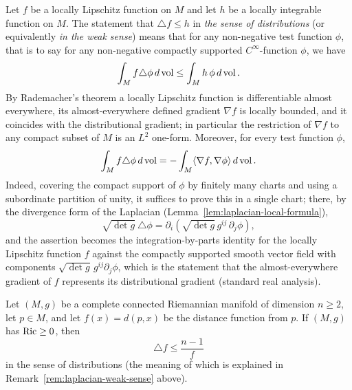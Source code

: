 \begin{remark}
\label{rem:laplacian-weak-sense}

\label{calabi}

Let $f$ be a locally Lipschitz function on $M$ and let $h$ be a
locally integrable function on $M$. The statement that $\triangle
f\leq h$ in {\sl the sense of distributions} (or equivalently {\sl
in the weak sense}) means that for any non-negative test function
$\phi$, that is to say for any non-negative compactly supported
$C^\infty$-function $\phi$, we have
$$\int_Mf\triangle \phi\, d\operatorname{vol}\le \int_M h\,\phi\, d\operatorname{vol}.$$
By Rademacher's theorem a locally Lipschitz function is
differentiable almost everywhere, its almost-everywhere defined
gradient $\nabla f$ is locally bounded, and it coincides with the
distributional gradient; in particular the restriction of $\nabla
f$ to any compact subset of $M$ is an $L^2$ one-form. Moreover, for
every test function $\phi$,
$$\int_Mf\triangle
\phi\, d\operatorname{vol}=-\int_M\langle \nabla f,\nabla\phi\rangle\, d\operatorname{vol}.$$
Indeed, covering the compact support of $\phi$ by finitely many
charts and using a subordinate partition of unity, it suffices to
prove this in a single chart; there, by the divergence form of the
Laplacian (Lemma~\ref{lem:laplacian-local-formula}),
$$\sqrt{\det g}\ \triangle\phi
=\partial_i\left(\sqrt{\det g}\,g^{ij}\,\partial_j\phi\right),$$
and the assertion becomes the integration-by-parts identity for the
locally Lipschitz function $f$ against the compactly supported
smooth vector field with components $\sqrt{\det
g}\,g^{ij}\partial_j\phi$, which is the statement that the
almost-everywhere gradient of $f$ represents its distributional
gradient (standard real analysis).
\end{remark}

\begin{example}
\label{ex:distance-function-laplacian}

Let $(M,g)$ be a complete connected Riemannian manifold of
dimension $n\ge2$, let $p\in M$, and let $f(x)=d(p,x)$ be the
distance function from $p$. If $(M, g)$ has
$\operatorname{Ric} \geq 0$, then
\[ \triangle f \leq \frac{n-1}{f} \]
 in the sense of distributions (the meaning of which is explained
in Remark~\ref{rem:laplacian-weak-sense} above).
\end{example}

